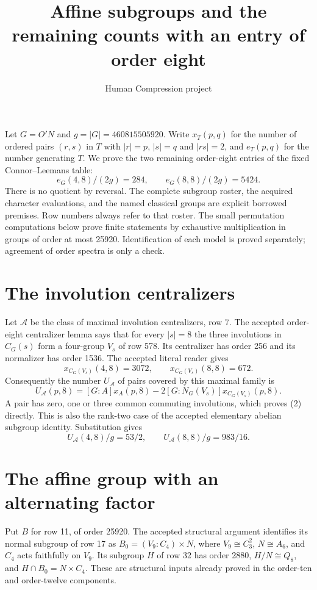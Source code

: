 \documentclass[11pt,a4paper]{article}
\title{Affine subgroups and the remaining counts with an entry of order eight}
\author{Human Compression project}\date{}
\begin{document}
\maketitle
Let $G=O'N$ and $g=|G|=460815505920$. Write $x_T(p,q)$ for the
number of ordered pairs $(r,s)$ in $T$ with $|r|=p$, $|s|=q$ and
$|rs|=2$, and $e_T(p,q)$ for the number generating $T$. We prove
the two remaining order-eight entries of the fixed Connor--Leemans table:
\[
 e_G(4,8)/(2g)=284,\qquad e_G(8,8)/(2g)=5424.                 \tag{1}
\]
There is no quotient by reversal. The complete subgroup roster,
the acquired character evaluations, and the named classical groups
are explicit borrowed premises. Row numbers always refer to that roster.
The small permutation computations below prove finite statements by
exhaustive multiplication in groups of order at most 25920. Identification
of each model is proved separately; agreement of order spectra is only
a check.

\section*{The involution centralizers}
Let $\mathcal A$ be the class of maximal involution centralizers, row 7.
The accepted order-eight centralizer lemma says that for every $|s|=8$
the three involutions in $C_G(s)$ form a four-group $V_s$ of row 578.
Its centralizer has order 256 and its normalizer has order 1536.
The accepted literal reader gives
\[
 x_{C_G(V_s)}(4,8)=3072,\qquad x_{C_G(V_s)}(8,8)=672.
\]
Consequently the number $U_{\mathcal A}$ of pairs covered by this
maximal family is
\[
 U_{\mathcal A}(p,8)=[G:A]x_A(p,8)
              -2[G:N_G(V_s)]x_{C_G(V_s)}(p,8).              \tag{2}
\]
A pair has zero, one or three common commuting involutions, which
proves (2) directly. This is also the rank-two case of the accepted
elementary abelian subgroup identity. Substitution gives
\[
 U_{\mathcal A}(4,8)/g=53/2,\qquad
 U_{\mathcal A}(8,8)/g=983/16.                              \tag{3}
\]

\section*{The affine group with an alternating factor}
Put $B$ for row 11, of order 25920. The accepted structural argument
identifies its normal subgroup of row 17 as
$B_0=(V_9:C_4)\times N$, where $V_9\cong C_3^2$, $N\cong A_6$,
and $C_4$ acts faithfully on $V_9$. Its subgroup $H$ of row 32 has
order 2880, $H/N\cong Q_8$, and
$H\cap B_0=N\times C_4$. These are structural inputs already proved
in the order-ten and order-twelve components.
\end{document}
